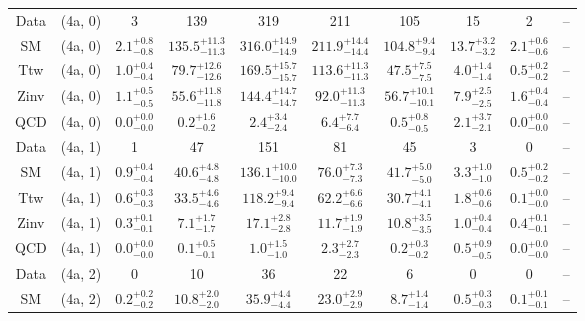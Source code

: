 \begin{table}[h!]
{\begin{tabular}{cccccccccc}
	Data & (4a, 0) & 3 & 139 & 319 & 211 & 105 & 15 & 2 & -- \\[0.5ex] 
	SM & (4a, 0) & $2.1^{+ 0.8 }_{- 0.8 }$ & $135.5^{+ 11.3 }_{- 11.3 }$ & $316.0^{+ 14.9 }_{- 14.9 }$ & $211.9^{+ 14.4 }_{- 14.4 }$ & $104.8^{+ 9.4 }_{- 9.4 }$ & $13.7^{+ 3.2 }_{- 3.2 }$ & $2.1^{+ 0.6 }_{- 0.6 }$ & -- \\[0.5ex] 
	Ttw & (4a, 0) & $1.0^{+ 0.4 }_{- 0.4 }$ & $79.7^{+ 12.6 }_{- 12.6 }$ & $169.5^{+ 15.7 }_{- 15.7 }$ & $113.6^{+ 11.3 }_{- 11.3 }$ & $47.5^{+ 7.5 }_{- 7.5 }$ & $4.0^{+ 1.4 }_{- 1.4 }$ & $0.5^{+ 0.2 }_{- 0.2 }$ & -- \\[0.5ex] 
	Zinv & (4a, 0) & $1.1^{+ 0.5 }_{- 0.5 }$ & $55.6^{+ 11.8 }_{- 11.8 }$ & $144.4^{+ 14.7 }_{- 14.7 }$ & $92.0^{+ 11.3 }_{- 11.3 }$ & $56.7^{+ 10.1 }_{- 10.1 }$ & $7.9^{+ 2.5 }_{- 2.5 }$ & $1.6^{+ 0.4 }_{- 0.4 }$ & -- \\[0.5ex] 
	QCD & (4a, 0) & $0.0^{+ 0.0 }_{- 0.0 }$ & $0.2^{+ 1.6 }_{- 0.2 }$ & $2.4^{+ 3.4 }_{- 2.4 }$ & $6.4^{+ 7.7 }_{- 6.4 }$ & $0.5^{+ 0.8 }_{- 0.5 }$ & $2.1^{+ 3.7 }_{- 2.1 }$ & $0.0^{+ 0.0 }_{- 0.0 }$ & -- \\[0.5ex] 
	Data & (4a, 1) & 1 & 47 & 151 & 81 & 45 & 3 & 0 & -- \\[0.5ex] 
	SM & (4a, 1) & $0.9^{+ 0.4 }_{- 0.4 }$ & $40.6^{+ 4.8 }_{- 4.8 }$ & $136.1^{+ 10.0 }_{- 10.0 }$ & $76.0^{+ 7.3 }_{- 7.3 }$ & $41.7^{+ 5.0 }_{- 5.0 }$ & $3.3^{+ 1.0 }_{- 1.0 }$ & $0.5^{+ 0.2 }_{- 0.2 }$ & -- \\[0.5ex] 
	Ttw & (4a, 1) & $0.6^{+ 0.3 }_{- 0.3 }$ & $33.5^{+ 4.6 }_{- 4.6 }$ & $118.2^{+ 9.4 }_{- 9.4 }$ & $62.2^{+ 6.6 }_{- 6.6 }$ & $30.7^{+ 4.1 }_{- 4.1 }$ & $1.8^{+ 0.6 }_{- 0.6 }$ & $0.1^{+ 0.0 }_{- 0.0 }$ & -- \\[0.5ex] 
	Zinv & (4a, 1) & $0.3^{+ 0.1 }_{- 0.1 }$ & $7.1^{+ 1.7 }_{- 1.7 }$ & $17.1^{+ 2.8 }_{- 2.8 }$ & $11.7^{+ 1.9 }_{- 1.9 }$ & $10.8^{+ 3.5 }_{- 3.5 }$ & $1.0^{+ 0.4 }_{- 0.4 }$ & $0.4^{+ 0.1 }_{- 0.1 }$ & -- \\[0.5ex] 
	QCD & (4a, 1) & $0.0^{+ 0.0 }_{- 0.0 }$ & $0.1^{+ 0.5 }_{- 0.1 }$ & $1.0^{+ 1.5 }_{- 1.0 }$ & $2.3^{+ 2.7 }_{- 2.3 }$ & $0.2^{+ 0.3 }_{- 0.2 }$ & $0.5^{+ 0.9 }_{- 0.5 }$ & $0.0^{+ 0.0 }_{- 0.0 }$ & -- \\[0.5ex] 
	Data & (4a, 2) & 0 & 10 & 36 & 22 & 6 & 0 & 0 & -- \\[0.5ex] 
	SM & (4a, 2) & $0.2^{+ 0.2 }_{- 0.2 }$ & $10.8^{+ 2.0 }_{- 2.0 }$ & $35.9^{+ 4.4 }_{- 4.4 }$ & $23.0^{+ 2.9 }_{- 2.9 }$ & $8.7^{+ 1.4 }_{- 1.4 }$ & $0.5^{+ 0.3 }_{- 0.3 }$ & $0.1^{+ 0.1 }_{- 0.1 }$ & -- \\[0.5ex] 

\end{tabular}}
\end{table}
